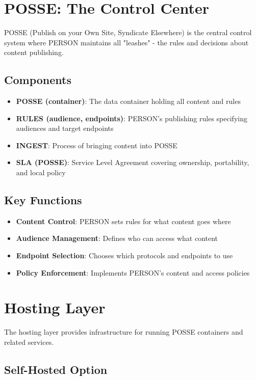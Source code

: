 \documentclass[11pt]{article}
\begin{document}
\section{POSSE: The Control Center}

POSSE (Publish on your Own Site, Syndicate Elsewhere) is the central control system where PERSON maintains all "leashes" - the rules and decisions about content publishing.

\subsection{Components}

\begin{itemize}
    \item \textbf{POSSE (container)}: The data container holding all content and rules
    \item \textbf{RULES (audience, endpoints)}: PERSON's publishing rules specifying audiences and target endpoints
    \item \textbf{INGEST}: Process of bringing content into POSSE
    \item \textbf{SLA (POSSE)}: Service Level Agreement covering ownership, portability, and local policy
\end{itemize}

\subsection{Key Functions}

\begin{itemize}
    \item \textbf{Content Control}: PERSON sets rules for what content goes where
    \item \textbf{Audience Management}: Defines who can access what content
    \item \textbf{Endpoint Selection}: Chooses which protocols and endpoints to use
    \item \textbf{Policy Enforcement}: Implements PERSON's content and access policies
\end{itemize}

\section{Hosting Layer}

The hosting layer provides infrastructure for running POSSE containers and related services.

\subsection{Self-Hosted Option}
\end{document}
